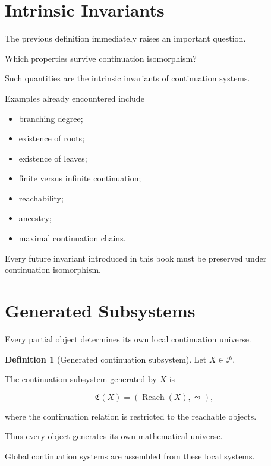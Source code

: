 \documentclass[13pt,openany]{book}
\theoremstyle{plain}
\theoremstyle{definition}
\newtheorem{definition}{Definition}[chapter]
\begin{document}
\section{Intrinsic Invariants}

The previous definition immediately raises an important question.

Which properties survive continuation isomorphism?

Such quantities are the intrinsic invariants of continuation systems.

Examples already encountered include

\begin{itemize}
\item branching degree;
\item existence of roots;
\item existence of leaves;
\item finite versus infinite continuation;
\item reachability;
\item ancestry;
\item maximal continuation chains.
\end{itemize}

Every future invariant introduced in this book must be preserved under
continuation isomorphism.

\section{Generated Subsystems}

Every partial object determines its own local continuation universe.

\begin{definition}[Generated continuation subsystem]
Let \(X\in\mathcal P\).

The continuation subsystem generated by \(X\) is

\[
\mathfrak C(X)
=
\left(
\operatorname{Reach}(X),
\leadsto
\right),
\]

where the continuation relation is restricted to the reachable objects.
\end{definition}

Thus every object generates its own mathematical universe.

Global continuation systems are assembled from these local systems.
\end{document}
